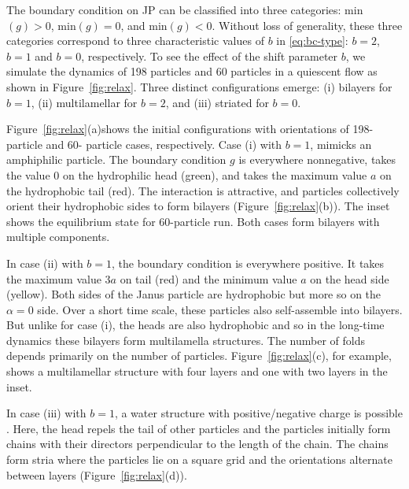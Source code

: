\documentclass[prb,preprint,showpacs,preprintnumbers,amsmath,amssymb,longbibliography]{revtex4-1}
\begin{document}
The boundary condition on JP can be classified into three categories: min$(g) >0$, min$(g) =0$, and min$(g) <0$. Without loss of generality, 
these three categories correspond to three characteristic values of $b$ in \eqref{eq:bc-type}: $b=2$, $b=1$ and $b=0$, respectively. 
%
To see the effect of the shift parameter $b$, we simulate the dynamics of
198 particles and 60 particles in a quiescent flow as shown in Figure~\ref{fig:relax}.
Three distinct configurations emerge:
(i) bilayers for $b = 1$, 
(ii) multilamellar for $b = 2$, and 
(iii) striated for $b = 0$.

Figure~\ref{fig:relax}(a)shows the initial configurations with orientations of 198-particle and 60- particle cases,
respectively. 
Case (i) with $b = 1$, mimicks an amphiphilic particle.
The boundary condition $g$ is everywhere nonnegative,
takes the value $0$ on the
hydrophilic head (green),
and takes the maximum value $a$ on the
hydrophobic tail (red). 
The interaction is attractive, and particles collectively orient their
hydrophobic sides to form bilayers  (Figure~\ref{fig:relax}(b)). The inset shows the equilibrium 
state for 60-particle run.
Both cases form bilayers with multiple components. 

In case (ii) with $b = 1$, the boundary condition is everywhere positive.
It takes the maximum value $3a$ on tail (red) and the
minimum value $a$ on the head side (yellow). 
Both sides of the Janus particle are hydrophobic but
more so on the $\alpha = 0$ side.  
Over a short time scale, these particles also self-assemble into bilayers. But unlike for case (i),
the heads are also hydrophobic and so in the long-time dynamics
these bilayers form multilamella structures.
The number of folds depends primarily on the number of particles.
Figure~\ref{fig:relax}(c), for example, shows a
multilamellar structure with four layers and one with two layers in the inset.

In case (iii) with $b=1$,
a water structure with
positive/negative charge is possible \cite{MaRa76, Ma77}.
Here, the head repels the tail of other particles
and the particles initially form chains with their directors perpendicular
to the length of the chain.  
The chains form stria
where the particles lie on a 
square grid and the orientations alternate
between layers (Figure~\ref{fig:relax}(d)).
\end{document}
